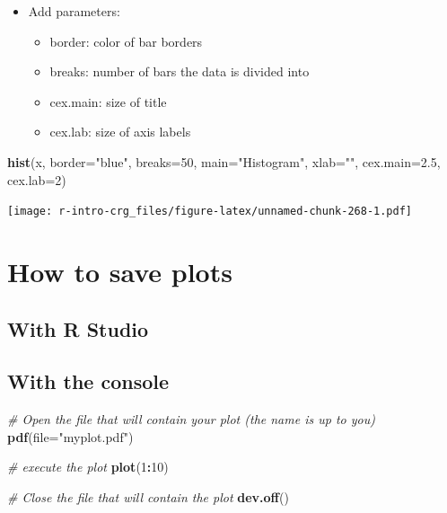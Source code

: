 \documentclass[]{book}
\newenvironment{Shaded}{\begin{snugshade}}{\end{snugshade}}
\newcommand{\CommentTok}[1]{\textcolor[rgb]{0.56,0.35,0.01}{\textit{#1}}}
\newcommand{\DataTypeTok}[1]{\textcolor[rgb]{0.13,0.29,0.53}{#1}}
\newcommand{\DecValTok}[1]{\textcolor[rgb]{0.00,0.00,0.81}{#1}}
\newcommand{\FloatTok}[1]{\textcolor[rgb]{0.00,0.00,0.81}{#1}}
\newcommand{\KeywordTok}[1]{\textcolor[rgb]{0.13,0.29,0.53}{\textbf{#1}}}
\newcommand{\NormalTok}[1]{#1}
\newcommand{\OperatorTok}[1]{\textcolor[rgb]{0.81,0.36,0.00}{\textbf{#1}}}
\newcommand{\StringTok}[1]{\textcolor[rgb]{0.31,0.60,0.02}{#1}}
\providecommand{\tightlist}{%
  \setlength{\itemsep}{0pt}\setlength{\parskip}{0pt}}
\begin{document}
\begin{itemize}
\tightlist
\item
  Add parameters:

  \begin{itemize}
  \tightlist
  \item
    border: color of bar borders
  \item
    breaks: number of bars the data is divided into
  \item
    cex.main: size of title
  \item
    cex.lab: size of axis labels
  \end{itemize}
\end{itemize}

\begin{Shaded}
\begin{Highlighting}[]
\KeywordTok{hist}\NormalTok{(x,}
    \DataTypeTok{border=}\StringTok{"blue"}\NormalTok{,}
    \DataTypeTok{breaks=}\DecValTok{50}\NormalTok{,}
    \DataTypeTok{main=}\StringTok{"Histogram"}\NormalTok{,}
    \DataTypeTok{xlab=}\StringTok{""}\NormalTok{,}
    \DataTypeTok{cex.main=}\FloatTok{2.5}\NormalTok{,}
    \DataTypeTok{cex.lab=}\DecValTok{2}\NormalTok{)}
\end{Highlighting}
\end{Shaded}

\texttt{[image: r-intro-crg\_files/figure-latex/unnamed-chunk-268-1.pdf]}

\hypertarget{how-to-save-plots}{%
\chapter{How to save plots}\label{how-to-save-plots}}

\hypertarget{with-r-studio}{%
\section{With R Studio}\label{with-r-studio}}

\hypertarget{with-the-console}{%
\section{With the console}\label{with-the-console}}

\begin{Shaded}
\begin{Highlighting}[]
\CommentTok{# Open the file that will contain your plot (the name is up to you)}
\KeywordTok{pdf}\NormalTok{(}\DataTypeTok{file=}\StringTok{"myplot.pdf"}\NormalTok{)}

\CommentTok{# execute the plot}
\KeywordTok{plot}\NormalTok{(}\DecValTok{1}\OperatorTok{:}\DecValTok{10}\NormalTok{)}

\CommentTok{# Close the file that will contain the plot}
\KeywordTok{dev.off}\NormalTok{()}
\end{Highlighting}
\end{Shaded}
\end{document}
